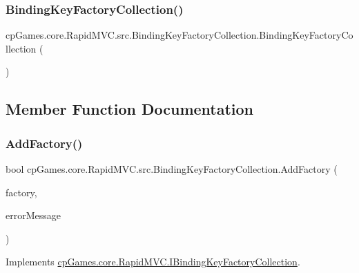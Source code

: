 \subsubsection{\texorpdfstring{BindingKeyFactoryCollection()}{BindingKeyFactoryCollection()}}
{\footnotesize\ttfamily cp\+Games.\+core.\+Rapid\+M\+V\+C.\+src.\+Binding\+Key\+Factory\+Collection.\+Binding\+Key\+Factory\+Collection (\begin{DoxyParamCaption}{ }\end{DoxyParamCaption})}



\subsection{Member Function Documentation}
\mbox{\label{classcp_games_1_1core_1_1_rapid_m_v_c_1_1src_1_1_binding_key_factory_collection_a27315eae9bada77b6da3eac11afb3f02}} 
\subsubsection{\texorpdfstring{AddFactory()}{AddFactory()}}
{\footnotesize\ttfamily bool cp\+Games.\+core.\+Rapid\+M\+V\+C.\+src.\+Binding\+Key\+Factory\+Collection.\+Add\+Factory (\begin{DoxyParamCaption}\item[{\mbox{\hyperlink{interfacecp_games_1_1core_1_1_rapid_m_v_c_1_1_i_binding_key_factory}{I\+Binding\+Key\+Factory}}}]{factory,  }\item[{out string}]{error\+Message }\end{DoxyParamCaption})}



Implements \mbox{\hyperlink{interfacecp_games_1_1core_1_1_rapid_m_v_c_1_1_i_binding_key_factory_collection_aa7aace3ebec361b82a563258ddda2213}{cp\+Games.\+core.\+Rapid\+M\+V\+C.\+I\+Binding\+Key\+Factory\+Collection}}.

\mbox{\label{classcp_games_1_1core_1_1_rapid_m_v_c_1_1src_1_1_binding_key_factory_collection_a75cdf372ae3c4f07c7b1caa86ed67425}} 
